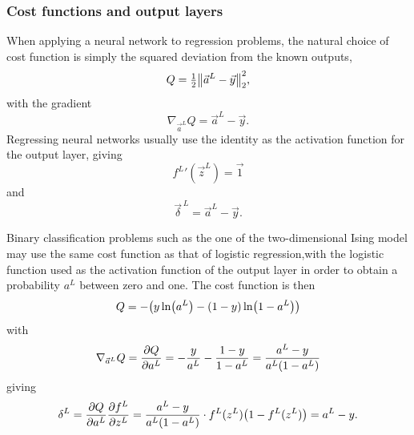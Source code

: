 \documentclass[11pt,british,a4paper]{article}
\numberwithin{equation}{section}
\begin{document}
\subsubsection{Cost functions and output layers}
When applying a neural network to regression problems, the natural choice of cost function is simply the squared deviation from the known outputs,
\begin{equation}
    Q = \tfrac{1}{2}\norm{\vec{a}^L - \vec{y}}_2^2,
\end{equation}
with the gradient
\begin{equation}
    \nabla_{\vec{a}^L} Q = \vec{a}^L - \vec{y}.
\end{equation}
Regressing neural networks usually use the identity as the activation function for the output layer, giving
\begin{equation}
    {f^L}'(\vec{z}^L) = \vec{1}
\end{equation}
and
\begin{equation}
    \vec{\delta}^{\,L} = \vec{a}^L - \vec{y}.
\end{equation}

Binary classification problems such as the one of the two-dimensional Ising model may use the same cost function as that of logistic regression,with the logistic function used as the activation function of the output layer in order to obtain a probability \(a^L\) between zero and one.
The cost function is then
\begin{equation}
    Q = -\qty(y\ln(a^L) - (1 - y)\ln(1-a^L))
\end{equation}
with
\begin{equation}
    \nabla_{\vec{a}^L} Q = \pdv{Q}{a^L} = -\frac{y}{a^L} - \frac{1-y}{1-a^L}
                         = \frac{a^L - y}{a^L\qty(1-a^L)}
\end{equation}
giving
\begin{equation}
    \delta^L = \pdv{Q}{a^L} \pdv{f^L}{z^L}
             = \frac{a^L - y}{a^L\qty(1-a^L)} \cdot f^L(z^L)\qty(1-f^L(z^L))
             = a^L - y.
\end{equation}



\end{document}
